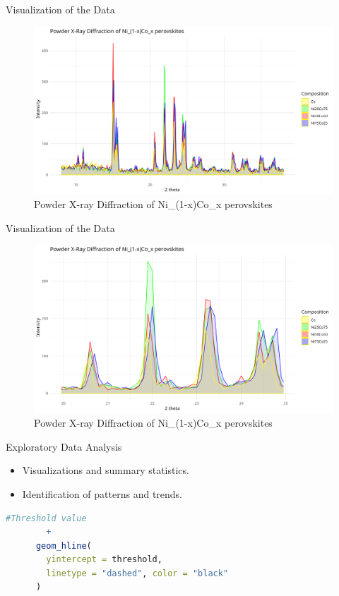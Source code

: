\documentclass[aspectratio=169]{beamer}
\begin{document}
\begin{frame}{Visualization of the Data}
    \begin{figure}
        \centering
        \includegraphics[width=1\textwidth]{../plot/graph_nt.png}
        \caption{Powder X-ray Diffraction of Ni\_(1-x)Co\_x perovskites}
        \label{fig:xrd}
    \end{figure}
\end{frame}

\begin{frame}{Visualization of the Data}
    \begin{figure}
        \centering
        \includegraphics[width=1\textwidth]{../plot/graph_nt_zoom.png}
        \caption{Powder X-ray Diffraction of Ni\_(1-x)Co\_x perovskites}
        \label{fig:xrd}
    \end{figure}
\end{frame}

\begin{frame}[fragile]{Exploratory Data Analysis}
    \begin{itemize}
        \item Visualizations and summary statistics.
        \item Identification of patterns and trends.
    \end{itemize}

    \begin{lstlisting}[language=R, basicstyle=\tiny\ttfamily]
      #Threshold value
        +
      geom_hline(
        yintercept = threshold,
        linetype = "dashed", color = "black"
      )
    \end{lstlisting}
\end{frame}
\end{document}
